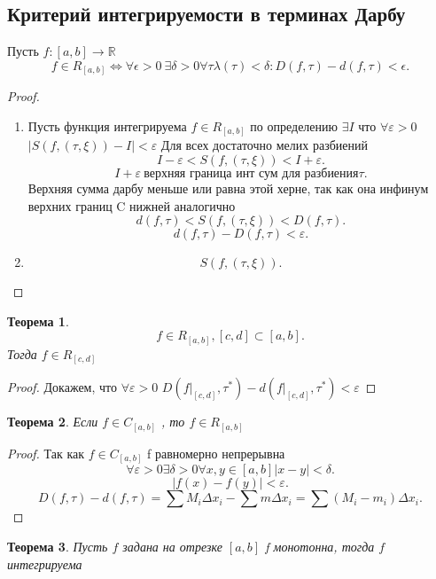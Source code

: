 \documentclass{scrartcl}
\newtheorem{theorem}{Теорема}
\begin{document}
\subsection{Критерий интегрируемости в терминах Дарбу}
Пусть $f:[a,b] \to \mathbb{R}$
\[
    f \in R_{[a,b]} \iff \forall \epsilon > 0 ~ \exists \delta >0 \forall  \tau 
    \lambda(\tau) < \delta : D(f,\tau) - d(f,\tau) < \epsilon
.\] 
\begin{proof}
     \begin{enumerate}
         \item Пусть функция интегрируема $f \in R_{[a,b]}$ по определению
             $\exists I$ что $\forall  \varepsilon > 0 $ $|S(f,(\tau,\xi)) - I| < \varepsilon$
             Для всех достаточно мелих разбиений
             \[
              I - \varepsilon < S(f,(\tau, \xi  )) < I + \varepsilon
             .\] 
             \[
                 I + \varepsilon ~ \text{верхняя граница инт сум для разбиения} \tau
             .\] 
             Верхняя сумма дарбу меньше или равна этой херне, так как она инфинум верхних границ
             C нижней аналогично
             \[
             d(f,\tau) < S(f,(\tau, \xi  )) < D(f,\tau)
             .\] 
             \[
                 d(f,\tau) - D(f,\tau) < \varepsilon
             .\] 
        \item
            \[
            S(f,(\tau, \xi))
            .\] 
    \end{enumerate}
\end{proof}
\begin{theorem}
    \[
        f \in R_{[a,b]} , [c,d] \subset [a,b]
    .\] 
    Тогда $f \in R_{[c,d]}$
\end{theorem}
\begin{proof}
    Докажем, что $\forall  \varepsilon > 0$ $D(f|_{[c,d]},\tau^{*}) - d(f|_{[c,d]},\tau^{*}) < \varepsilon$
\end{proof}
\begin{theorem} 
    Если $f \in C_{[a,b]}$ , то $f \in R_{[a,b]}$
\end{theorem}
\begin{proof}
    Так как $f \in C_{[a,b]}$ f равномерно непрерывна 
    \[
        \forall  \varepsilon > 0 \exists  \delta > 0 \forall x,y \in [a,b] |x - y| < \delta
    .\] 
    \[
        |f(x) - f(y)| < \varepsilon
    .\] 
    \[
    D(f,\tau) - d(f,\tau) = \sum M_{i}\Delta x_{i} - \sum m \Delta x_{i} = 
    \sum (M_{i} - m_{i}) \Delta x_{i}
    .\]
\end{proof}
\begin{theorem}
    Пусть $f$ задана на отрезке  $[a,b]$ f монотонна, тогда  $f$ интегрируема
\end{theorem}
\end{document}
